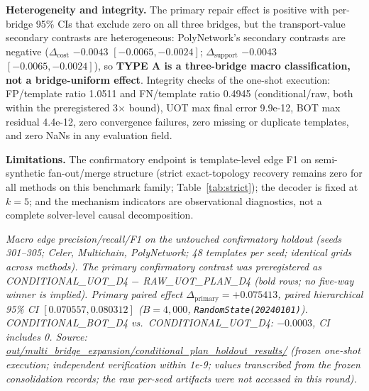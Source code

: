 \textbf{Heterogeneity and integrity.} The primary repair effect is positive with per-bridge 95\% CIs that exclude zero on all three bridges, but the transport-value secondary contrasts are heterogeneous: PolyNetwork's secondary contrasts are negative ($\Delta_{\mathrm{cost}}$ $-0.0043$ $[-0.0065, -0.0024]$; $\Delta_{\mathrm{support}}$ $-0.0043$ $[-0.0065, -0.0024]$), so \textbf{TYPE A is a three-bridge macro classification, not a bridge-uniform effect}. Integrity checks of the one-shot execution: FP/template ratio 1.0511 and FN/template ratio 0.4945 (conditional/raw, both within the preregistered 3$\times$ bound), UOT max final error 9.9e-12, BOT max residual 4.4e-12, zero convergence failures, zero missing or duplicate templates, and zero NaNs in any evaluation field.

\textbf{Limitations.} The confirmatory endpoint is template-level edge F1 on semi-synthetic fan-out/merge structure (strict exact-topology recovery remains zero for all methods on this benchmark family; Table~\ref{tab:strict}); the decoder is fixed at $k=5$; and the mechanism indicators are observational diagnostics, not a complete solver-level causal decomposition.

\begin{table}[!t]
\caption{Preregistered confirmatory holdout (seeds 301--305), five frozen decoding methods.}
\label{tab:confirmatory}
\centering
{}
\end{table}

\emph{Macro edge precision/recall/F1 on the untouched confirmatory holdout (seeds 301--305; Celer, Multichain, PolyNetwork; 48 templates per seed; identical grids across methods). The primary confirmatory contrast was preregistered as CONDITIONAL\_UOT\_D4 $-$ RAW\_UOT\_PLAN\_D4 (bold rows; no five-way winner is implied). Primary paired effect $\Delta_{\mathrm{primary}} = +0.075413$, paired hierarchical 95\% CI $[0.070557, 0.080312]$ ($B=4{,}000$, \texttt{RandomState(20240101)}). CONDITIONAL\_BOT\_D4 vs.\ CONDITIONAL\_UOT\_D4: $-0.0003$, CI includes 0. Source: \url{out/multi_bridge_expansion/conditional_plan_holdout_results/} (frozen one-shot execution; independent verification within 1e-9; values transcribed from the frozen consolidation records; the raw per-seed artifacts were not accessed in this round).}

